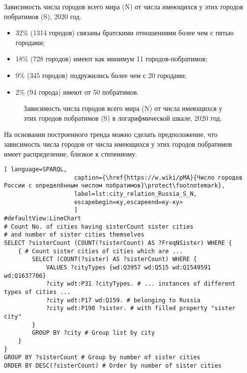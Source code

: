 \begin{marginfigure}[0.0cm]
{
\setlength{\fboxsep}{0pt}%
\setlength{\fboxrule}{1pt}%
}
  \caption{Зависимость числа городов всего мира (N) от числа имеющихся у этих городов побратимов (S), 2020 год.}
  \label{fig:city_relation_S_N}
\end{marginfigure}

\begin{itemize}
\item 32\% (\num{1314} городов) связаны братскими отношениями более чем с пятью городами;
\item 18\% (728 городов) имеют как минимум 11 городов-побратимов;
\item 9\% (345 городов) подружились более чем с 20 городами;
\item 2\% (94 города) имеют от 50 побратимов.
\end{itemize}

\begin{figure*}[h]
{
\setlength{\fboxsep}{0pt}%
\setlength{\fboxrule}{1pt}%
%
}
  \caption{Зависимость числа городов всего мира (N) от числа имеющихся у этих городов побратимов (S) в логарифмической шкале, 2020 год.}%
  \label{fig:city_ln_relation_S_N}%
\end{figure*}

На основании построенного тренда можно сделать предположение, что зависимость числа городов от числа имеющихся у этих городов побратимов имеет распределение, близкое к степенному.

\begin{lstlisting}[ language=SPARQL, 
                    caption={\href{https://w.wiki/pMA}{Число городов России с определённым числом побратимов}\protect\footnotemark},
                    label=lst:city_relation_Russia_S_N, 
                    escapebegin=ку,escapeend=ку-ку>
                    ]
#defaultView:LineChart                                                   
# Count No. of cities having sisterCount sister cities  
# and number of sister cities themselves
SELECT ?sisterCount (COUNT(?sisterCount) AS ?FreqNSister) WHERE {                                                                                  
	{ # Count sister cities of cities which are ...
		SELECT (COUNT(?sister) AS ?sisterCount) WHERE {    
			VALUES ?cityTypes {wd:Q3957 wd:Q515 wd:Q1549591 wd:Q1637706}
			?city wdt:P31 ?cityTypes. # ... instances of different types of cities ...
			?city wdt:P17 wd:Q159. # belonging to Russia
			?city wdt:P190 ?sister. # with filled property "sister city"
		}
		GROUP BY ?city # Group list by city                             
	}
}
GROUP BY ?sisterCount # Group by number of sister cities
ORDER BY DESC(?sisterCount) # Order by number of sister cities                                  
\end{lstlisting}

